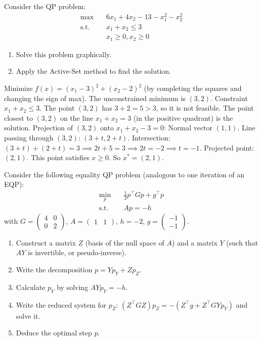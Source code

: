 \bigskip
\begin{exercice}
Consider the QP problem:
\begin{align*}
    \max \quad & 6x_1 + 4x_2 - 13 - x_1^2 - x_2^2 \\
    \text{s.t. } \quad & x_1 + x_2 \le 3 \\
               & x_1 \ge 0, x_2 \ge 0
\end{align*}
\begin{enumerate}
    \item Solve this problem graphically.
    \item Apply the Active-Set method to find the solution.
\end{enumerate}
\end{exercice}

\begin{correction}
Minimize $f(x) = (x_1 - 3)^2 + (x_2 - 2)^2$ (by completing the squares and changing the sign of max).
The unconstrained minimum is $(3, 2)$.
Constraint $x_1 + x_2 \le 3$. The point $(3,2)$ has $3+2=5 > 3$, so it is not feasible.
The point closest to $(3,2)$ on the line $x_1+x_2=3$ (in the positive quadrant) is the solution.
Projection of $(3,2)$ onto $x_1+x_2-3=0$:
Normal vector $(1,1)$. Line passing through $(3,2)$: $(3+t, 2+t)$.
Intersection: $(3+t) + (2+t) = 3 \implies 2t + 5 = 3 \implies 2t = -2 \implies t=-1$.
Projected point: $(2, 1)$.
This point satisfies $x \ge 0$. So $x^*=(2,1)$.
\end{correction}
\bigskip

\bigskip
\begin{exercice}
Consider the following equality QP problem (analogous to one iteration of an EQP):
\begin{align*}
    \min_{p} \quad & \frac{1}{2} p^\top G p + g^\top p \\
    \text{s.t. } \quad & A p = -h
\end{align*}
with $G = \begin{pmatrix} 4 & 0 \\ 0 & 2 \end{pmatrix}$, $A = \begin{pmatrix} 1 & 1 \end{pmatrix}$, $h = -2$, $g = \begin{pmatrix} -1 \\ -1 \end{pmatrix}$.
\begin{enumerate}
    \item Construct a matrix $Z$ (basis of the null space of $A$) and a matrix $Y$ (such that $AY$ is invertible, or pseudo-inverse).
    \item Write the decomposition $p = Y p_Y + Z p_Z$.
    \item Calculate $p_Y$ by solving $AY p_Y = -h$.
    \item Write the reduced system for $p_Z$: $(Z^\top G Z) p_Z = -(Z^\top g + Z^\top G Y p_Y)$ and solve it.
    \item Deduce the optimal step $p$.
\end{enumerate}
\end{exercice}

